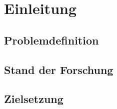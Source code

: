 \chapter{Einleitung}
\blindtext

\section{Problemdefinition}
\blindtext

\section{Stand der Forschung}
\blindtext

\section{Zielsetzung}
\blindtext
